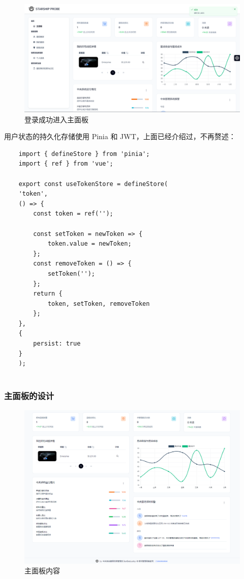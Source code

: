 \documentclass{base}
\begin{document}
\begin{figure}[H]
	\centering
	\includegraphics[width=\linewidth]{images/LoginSuccess}
	\caption{登录成功进入主面板}
	\label{fig:loginsuccess}
\end{figure}

用户状态的持久化存储使用 Pinia 和 JWT，上面已经介绍过，不再赘述：

\begin{verbatim}
	import { defineStore } from 'pinia';
	import { ref } from 'vue';
	
	export const useTokenStore = defineStore(
	'token',
	() => {
		const token = ref('');
		
		const setToken = newToken => {
			token.value = newToken;
		};
		const removeToken = () => {
			setToken('');
		};
		return {
			token, setToken, removeToken
		};
	},
	{
		persist: true
	}
	);
	
\end{verbatim}

\subsubsection{主面板的设计}

\begin{figure}[H]
	\centering
	\includegraphics[width=\linewidth]{images/Dashboard}
	\caption{主面板内容}
	\label{fig:dashboard}
\end{figure}
\end{document}
